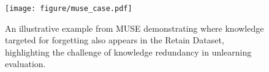 \begin{figure}[!tbp]
    \centering     
    \texttt{[image: figure/muse\_case.pdf]}
    \caption{An illustrative example from MUSE demonstrating where knowledge targeted for forgetting also appears in the Retain Dataset, highlighting the challenge of knowledge redundancy in unlearning evaluation.}
    \label{fig:musecase}
\end{figure}